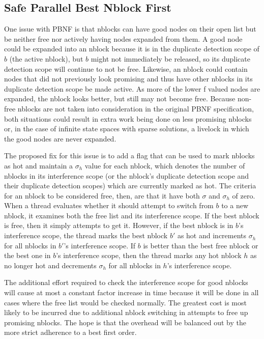 \documentclass{article}
\begin{document}
\subsection{Safe Parallel Best Nblock First}
One issue with PBNF is that nblocks can have good nodes on their open list but be neither free nor actively having nodes expanded from them. A good node could be expanded into an nblock because it is in the duplicate detection scope of $b$ (the active nblock), but $b$ might not immediately be released, so its duplicate detection scope will continue to not be free. Likewise, an nblock could contain nodes that did not previously look promising and thus have other nblocks in its duplicate detection scope be made active. As more of the lower f valued nodes are expanded, the nblock looks better, but still may not become free. Because non-free nblocks are not taken into consideration in the original PBNF specification, both situations could result in extra work being done on less promising nblocks or, in the case of infinite state spaces with sparse solutions, a livelock in which the good nodes are never expanded.

The proposed fix for this issue is to add a flag that can be used to mark nblocks as hot and maintain a $\sigma_h$ value for each nblock, which denotes the number of nblocks in its interference scope (or the nblock's duplicate detection scope and their duplicate detection scopes) which are currently marked as hot. The criteria for an nblock to be considered free, then, are that it have both $\sigma$ and $\sigma_h$ of zero. When a thread evaluates whether it should attempt to switch from $b$ to a new nblock, it examines both the free list and its interference scope. If the best nblock is free, then it simply attempts to get it. However, if the best nblock is in $b$'s interference scope, the thread marks the best nblock $b'$ as hot and increments $\sigma_h$ for all nblocks in $b'$'s interference scope. If $b$ is better than the best free nblock or the best one in $b$'s interference scope, then the thread marks any hot nblock $h$ as no longer hot and decrements $\sigma_h$ for all nblocks in $h$'s interference scope.

The additional effort required to check the interference scope for good nblocks will cause at most a constant factor increase in time because it will be done in all cases where the free list would be checked normally. The greatest cost is most likely to be incurred due to additional nblock switching in attempts to free up promising nblocks. The hope is that the overhead will be balanced out by the more strict adherence to a best first order.
\end{document}
